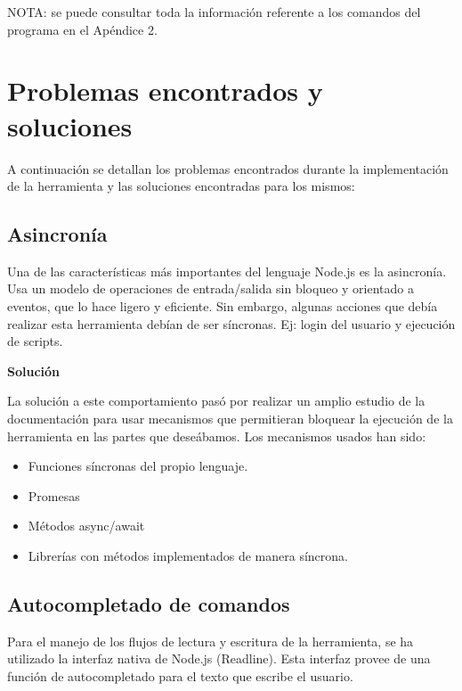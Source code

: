 NOTA: se puede consultar toda la información referente a los comandos del programa en el Apéndice 2.

\section{Problemas encontrados y soluciones}
\label{3:sec:3}

A continuación se detallan los problemas encontrados durante la implementación de la herramienta y las soluciones encontradas para los mismos:

\subsection{Asincronía}
\label{subsec:3.3.1}

Una de las características más importantes del lenguaje Node.js es la asincronía. Usa un modelo de operaciones de entrada/salida sin bloqueo y orientado a eventos, que lo hace ligero y eficiente. Sin embargo, algunas acciones que debía realizar esta herramienta debían de ser síncronas. Ej: login del usuario y ejecución de scripts.
\bigskip

{\normalsize {\bfseries Solución}}
\bigskip

La solución a este comportamiento pasó por realizar un amplio estudio de la documentación para usar mecanismos que permitieran bloquear la ejecución de la herramienta en las partes que deseábamos. Los mecanismos usados han sido:

\begin{itemize}
	\item Funciones síncronas del propio lenguaje.
	\item Promesas
	\item Métodos async/await
	\item Librerías con métodos implementados de manera síncrona.
\end{itemize}

\subsection{Autocompletado de comandos}
\label{subsec:3.3.2}

Para el manejo de los flujos de lectura y escritura de la herramienta, se ha utilizado la interfaz nativa de Node.js (Readline). Esta interfaz provee de una función de autocompletado para el texto que escribe el usuario.

